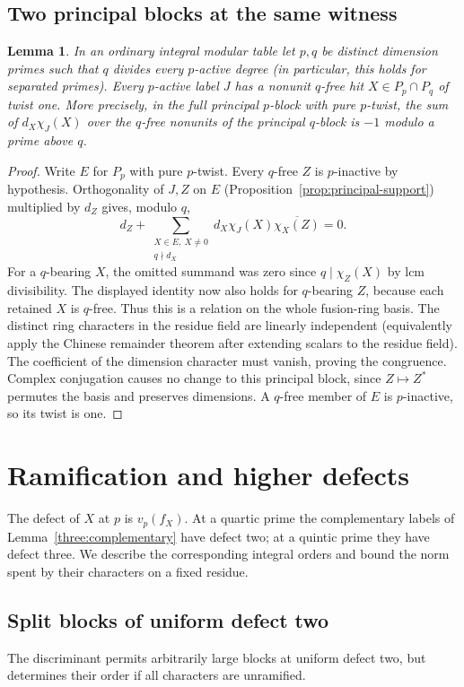\documentclass[11pt,a4paper]{article}
\numberwithin{equation}{section}
\newtheorem{lemma}[theorem]{Lemma}
\theoremstyle{remark}
\begin{document}
\subsection{Two principal blocks at the same witness}\label{found:T:5}
\begin{lemma}\label{found:T:5.1}\label{found:T:key:lem:separated-double-principal}
In an ordinary integral modular table let $p,q$ be distinct
dimension primes such that $q$ divides every $p$-active degree
(in particular, this holds for separated primes). Every $p$-active
label $J$ has a nonunit
$q$-free hit $X\in P_p\cap P_q$ of twist one. More precisely,
in the full principal $p$-block with pure $p$-twist, the sum
of $d_X\chi_J(X)$ over the $q$-free nonunits of the principal
$q$-block is $-1$ modulo a prime above $q$.
\end{lemma}
\begin{proof}
Write $E$ for $P_p$ with pure $p$-twist. Every $q$-free $Z$ is
$p$-inactive by hypothesis. Orthogonality of $J,Z$ on $E$ (Proposition~\ref{prop:principal-support}) multiplied by $d_Z$ gives, modulo
$q$,
\[
 d_Z+\sum_{\substack{X\in E,\ X\ne0\\q\nmid d_X}}
 d_X\chi_J(X)\overline{\chi_X(Z)}=0.
\]
For a $q$-bearing $X$, the omitted summand was zero since
$q\mid\chi_Z(X)$ by lcm divisibility. The displayed identity now
also holds for $q$-bearing $Z$, because each retained $X$ is
$q$-free. Thus this is a relation on the whole fusion-ring basis.
The distinct ring characters in the residue field are linearly
independent (equivalently apply the Chinese remainder theorem after
extending scalars to the residue field). The coefficient of the
dimension character must vanish, proving the congruence.
Complex conjugation causes no change to this principal block,
since $Z\mapsto Z^*$ permutes the basis and preserves dimensions.
A $q$-free member of $E$ is $p$-inactive, so its twist is one.
\end{proof}

\section{Ramification and higher defects}\label{fam:M:sec:5}\label{sec:higher-defect}
The defect of $X$ at $p$ is $v_p(f_X)$. At a quartic prime the
complementary labels of Lemma~\ref{three:complementary} have defect
two; at a quintic prime they have defect three. We describe the
corresponding integral orders and bound the norm spent by their
characters on a fixed residue.
\subsection{Split blocks of uniform defect two}\label{fam:M:sec:5.1}
The discriminant permits arbitrarily large blocks at uniform defect
two, but determines their order if all characters are unramified.
\end{document}
